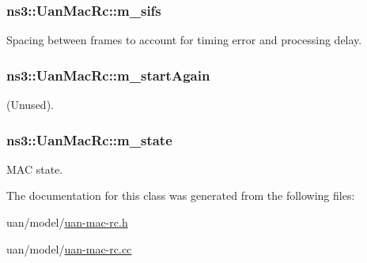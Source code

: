 \subsubsection[{\texorpdfstring{m\+\_\+sifs}{m_sifs}}]{ ns3\+::\+Uan\+Mac\+Rc\+::m\+\_\+sifs\hspace{0.3cm}{\ttfamily [private]}}\hypertarget{classns3_1_1UanMacRc_abf32927f32a30e4a0b6793fee11b53d7}{}\label{classns3_1_1UanMacRc_abf32927f32a30e4a0b6793fee11b53d7}


Spacing between frames to account for timing error and processing delay. 

\subsubsection[{\texorpdfstring{m\+\_\+start\+Again}{m_startAgain}}]{ ns3\+::\+Uan\+Mac\+Rc\+::m\+\_\+start\+Again\hspace{0.3cm}{\ttfamily [private]}}\hypertarget{classns3_1_1UanMacRc_a1e965b39691ded14a5ab7204d0859312}{}\label{classns3_1_1UanMacRc_a1e965b39691ded14a5ab7204d0859312}


(Unused). 

\subsubsection[{\texorpdfstring{m\+\_\+state}{m_state}}]{ ns3\+::\+Uan\+Mac\+Rc\+::m\+\_\+state\hspace{0.3cm}{\ttfamily [private]}}\hypertarget{classns3_1_1UanMacRc_a99267f5ad3a4ac69c0708414974dcb39}{}\label{classns3_1_1UanMacRc_a99267f5ad3a4ac69c0708414974dcb39}


M\+AC state. 



The documentation for this class was generated from the following files\+:\begin{DoxyCompactItemize}
\item 
uan/model/\hyperlink{uan-mac-rc_8h}{uan-\/mac-\/rc.\+h}\item 
uan/model/\hyperlink{uan-mac-rc_8cc}{uan-\/mac-\/rc.\+cc}\end{DoxyCompactItemize}
